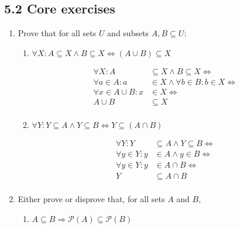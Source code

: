 \documentclass[10pt,\jkfside,a4paper]{article}
\begin{document}
\subsection*{5.2 Core exercises}

\begin{enumerate}

\item Prove that for all sets $U$ and subsets $A, B \subseteq U$:

\begin{enumerate}

\item $\forall X: A \subseteq X \wedge B \subseteq X \Longleftrightarrow (A \cup B) \subseteq X$

\begin{equation}
\begin{split}
\forall X : A &\subseteq X \wedge B \subseteq X \Longleftrightarrow\\
\forall a \in A : a &\in X \wedge \forall b \in B : b \in X \Longleftrightarrow\\
\forall x \in A \cup B : x &\in X \Longleftrightarrow\\
A \cup B &\subseteq X\\
\end{split}
\end{equation}

\item $\forall Y: Y \subseteq A \wedge Y \subseteq B \Longleftrightarrow Y \subseteq (A \cap B)$

\begin{equation}
\begin{split}
\forall Y : Y &\subseteq A \wedge Y \subseteq B \Longleftrightarrow\\
\forall y \in Y : y &\in A \wedge y \in B \Longleftrightarrow\\
\forall y \in Y : y &\in A \cap B \Longleftrightarrow\\
Y &\subseteq A \cap B\\
\end{split}
\end{equation}

\end{enumerate}

\item Either prove or disprove that, for all sets $A$ and $B$,

\begin{enumerate}

\item $A \subseteq B \Longrightarrow \mathcal{P}(A) \subseteq \mathcal{P}(B)$


\end{enumerate}
\end{enumerate}
\end{document}
